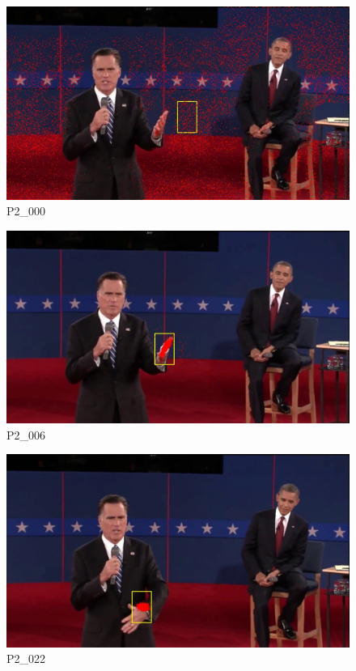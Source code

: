 \documentclass[10pt, conference, compsocconf]{IEEEtran}
\begin{document}
\begin{figure}[H]
	\centering
	\includegraphics[scale = 0.20]{image/000.jpg}
	\caption{P2\_000}
	\label{fig:000}
\end{figure}

\begin{figure}[H]
	\centering
	\includegraphics[scale = 0.20]{image/006.jpg}
	\caption{P2\_006}
	\label{fig:006}
\end{figure}

\begin{figure}[H]
	\centering
	\includegraphics[scale = 0.20]{image/022.jpg}
	\caption{P2\_022}
	\label{fig:022}
\end{figure}
\end{document}
